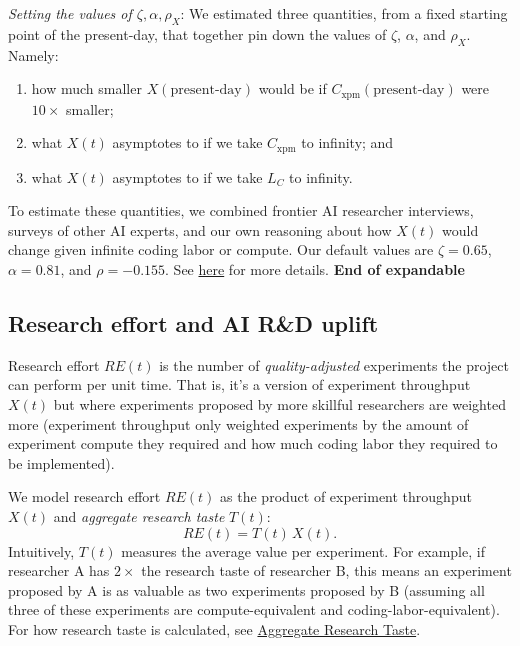 \documentclass{article}
\theoremstyle{definition}
\begin{document}
\textit{Setting the values of $\zeta, \alpha, \rho_X$}: We estimated three quantities, from a fixed starting point of the present-day, that together pin down the values of $\zeta$, $\alpha$, and $\rho_X$. Namely:
\begin{enumerate}
\item how much smaller $X(\text{present-day})$ would be if $C_{\text{xpm}}(\text{present-day})$ were $10\times$ smaller;
\item what $X(t)$ asymptotes to if we take $C_{\text{xpm}}$ to infinity; and
\item what $X(t)$ asymptotes to if we take $L_C$ to infinity.
\end{enumerate}
To estimate these quantities, we combined frontier AI researcher interviews, surveys of other AI experts, and our own reasoning about how $X(t)$ would change given infinite coding labor or compute. Our default values are $\zeta = 0.65$, $\alpha = 0.81$, and $\rho = -0.155$. See \href{https://docs.google.com/document/d/1ru6Okbxb6XuH18Cz8439sdQJazMV39hNxsWDokh97r0/edit?tab=t.0#bookmark=id.z11wqimj4fl4}{here} for more details.
\textbf{End of expandable}

\subsection{Research effort and AI R\&D uplift} \label{Research effort}

Research effort $RE(t)$ is the number of \textit{quality-adjusted} experiments the project can perform per unit time. That is, it's a version of experiment throughput $X(t)$ but where experiments proposed by more skillful researchers are weighted more (experiment throughput only weighted experiments by the amount of experiment compute they required and how much coding labor they required to be implemented).

We model research effort $RE(t)$ as the product of experiment throughput $X(t)$ and \textit{aggregate research taste} $T(t)$:
\[ RE(t) = T(t) \, X(t).\]
Intuitively, $T(t)$ measures the average value per experiment. For example, if researcher A has $2 \times$ the research taste of researcher B, this means an experiment proposed by A is as valuable as two experiments proposed by B (assuming all three of these experiments are compute-equivalent and coding-labor-equivalent). For how research taste is calculated, see \hyperref[Aggregate research taste]{Aggregate Research Taste}. 

\end{document}
